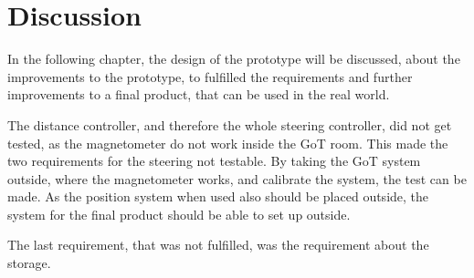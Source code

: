 \chapter{Discussion}
In the following chapter, the design of the prototype will be discussed, about the improvements to the prototype, to fulfilled the requirements and further improvements to a final product, that can be used in the real world.

The distance controller, and therefore the whole steering controller, did not get tested, as the magnetometer do not work inside the GoT room. This made the two requirements for the steering not testable. By taking the GoT system outside, where the magnetometer works, and calibrate the system, the test can be made. As the position system when used also should be placed outside, the system for the final product should be able to set up outside.

The last requirement, that was not fulfilled, was the requirement about the storage.














